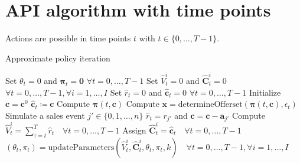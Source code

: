\section{API algorithm with time points}

Actions are possible in time points  $t$ with $t\in \{0, \dots, T-1\}$.

\begin{algorithm}
	\caption{Approximate policy iteration}\label{alg-API}
	\begin{algorithmic}[1]
		\State Set $\theta_t = 0$ and $\boldsymbol{\pi}_t = \boldsymbol{0}$ $\forall t = 0, \dots, T-1$ \label{alg-API1}
		 \label{alg-API-Piter1}
		\State Set $\hat{V}_t^i = 0$ and $\boldsymbol{\hat{C}}_t^i = 0$ $\forall t = 0, \dots, T-1, \forall i = 1, \dots, I$\label{alg-API-Piter2}\label{alg-API3}
		\label{alg-API-Peval1}
		\State Set $\hat{r}_t = 0$ and $\boldsymbol{\hat{c}}_t = 0$ $\forall t = 0, \dots, T-1$\label{alg-API5}
		\State Initialize $\boldsymbol{c} = \boldsymbol{c}^0$\label{alg-API6}
		\State $\boldsymbol{\hat{c}}_t \coloneqq \boldsymbol{c}$\label{alg-API8}
		\State Compute $\boldsymbol{\pi}(t, \boldsymbol{c})$ \label{alg-API-calcPi}\label{alg-API9}
		\State Compute $\boldsymbol{x} = \text{determineOfferset}(\boldsymbol{\pi}(t, \boldsymbol{c}), \epsilon_t)$\label{alg-API10}
		\State Simulate a sales event $j' \in \{0, 1, \dots, n\}$\label{alg-API11}
		\State $\hat{r}_t = r_{j'}$ and $\boldsymbol{c} = \boldsymbol{c} - \boldsymbol{a}_{j'}$\label{alg-API13}
		\EndIf
		\EndFor
		\State Compute $\hat{V}_t^i = \sum_{\tau = t}^{T}\hat{r}_t \quad \forall t = 0, \dots, T-1$\label{alg-API14}
		\State Assign $\boldsymbol{\hat{C}}_t^i = \boldsymbol{\hat{c}}_t \quad \forall t = 0, \dots, T-1$\label{alg-API15} \label{alg-API-Peval2}
		\EndFor
		\State $\left(\theta_t, \pi_t \right) = \text{updateParameters}\left(\hat{V}_t^i, \boldsymbol{\hat{C}}_t^i, \theta_t, \pi_t, k\right) \quad \forall t = 0, \dots, T-1, \forall i = 1, \dots, I$ \label{alg-API-updateParam}\label{alg-API-Piter3}
		\EndFor
	\end{algorithmic}
\end{algorithm}